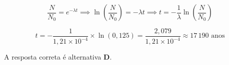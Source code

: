 \begin{flushleft}
\vspace{0.3cm}


\[
\frac{N}{N_0} = e^{-\lambda t} \implies \ln\left(\frac{N}{N_0}\right) = -\lambda t \implies t = -\frac{1}{\lambda} \ln\left(\frac{N}{N_0}\right)
\]

\vspace{0.3cm}


\[
t = -\frac{1}{1{,}21 \times 10^{-4}} \times \ln(0{,}125) = \frac{2{,}079}{1{,}21 \times 10^{-4}} \approx 17\,190 \text{ anos}
\]

\vspace{0.3cm}


A resposta correta é alternativa \colorbox{green!50}{\textbf{D}}.
\end{flushleft}


